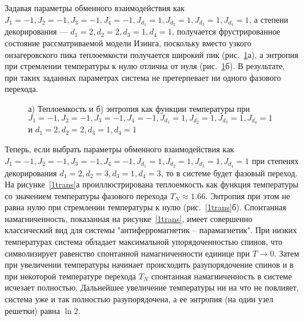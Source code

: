 Задавая параметры обменного взаимодействия как $J_1 = -1, J_2 = -1, J_3 = -1, J_4 = -1, J_{d_1} = 1, J_{d_2} = 1, J_{d_3} = 1, J_{d_4} = 1$, а степени декорирования --- $d_1 = 2, d_2 = 2, d_3 = 1, d_4 = 1$, получается фрустрированное состояние рассматриваемой модели Изинга, поскольку вместо узкого онзагеровского пика теплоемкости получается широкий пик (рис.~\ref{0trans}а), а энтропия при стремлении температуры к нулю отлична от нуля (рис.~\ref{0trans}б). В результате, при таких заданных параметрах система не претерпевает ни одного фазового перехода.

 \begin{figure}[h]
	\begin{minipage}{0.47\linewidth}
	\end{minipage}
	\hfill
	\begin{minipage}{0.47\linewidth}
	\end{minipage}
	\caption{а) Теплоемкость и б) энтропия как функции температуры при $J_1 = -1, J_2 = -1, J_3 = -1, J_4 = -1, J_{d_1} = 1, J_{d_2} = 1, J_{d_3} = 1, J_{d_4} = 1$ и $d_1 = 2, d_2 = 2, d_3 = 1, d_4 = 1$}
	\label{0trans}
\end{figure}

Теперь, если выбрать параметры обменного взаимодействия как $J_1 = -1, J_2 = -1, J_3 = -1, J_4 = -1, J_{d_1} = 1, J_{d_2} = 1, J_{d_3} = 1, J_{d_4} = 1$ при степенях декорирования $d_1 = 2, d_2 = 3, d_3 = 1, d_4 = 3$, то в системе будет фазовый переход. На рисунке~\ref{1trans}а проиллюстрирована теплоемкость как функция температуры со значением температуры фазового перехода $T_N \approx 1.66$. Энтропия при этом не равна нулю при стремлении температуры к нулю (рис.~\ref{1trans}б). Спонтанная намагниченность, показанная на рисунке~\ref{1trans}, имеет совершенно классический вид для системы "антиферромагнетик -- парамагнетик". При низких температурах система обладает максимальной упорядоченностью спинов, что символизирует равенство спонтанной намагниченности единице при $T \rightarrow 0$. Затем при увеличении температуры начинает происходить разупорядочение спинов и в при некоторой температуре перехода $T_N$ спонтанная намагниченность в системе исчезает полностью. Дальнейшее увеличение температуры ни на что не повлияет, система уже и так полностью разупорядочена, а ее энтропия (на один узел решетки) равна $\ln 2$.  

